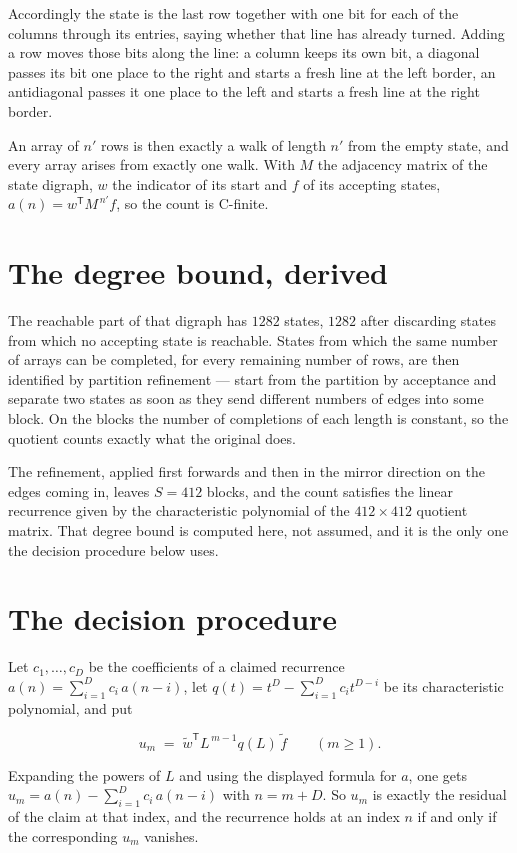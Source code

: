 \documentclass[11pt]{article}
\theoremstyle{definition}
\begin{document}
Accordingly the state is the last row together with one bit for each of the columns through its entries, saying whether that line has already turned. Adding a row moves those bits along the line: a column keeps its own bit, a diagonal passes its bit one place to the right and starts a fresh line at the left border, an antidiagonal passes it one place to the left and starts a fresh line at the right border.

An array of $n'$ rows is then exactly a walk of length $n'$ from the empty state, and every array arises from exactly one walk. With $M$ the adjacency matrix of the state digraph, $w$ the indicator of its start and $f$ of its accepting states, $a(n) = w^{\mathsf T}M^{\,n'}f$, so the count is C-finite.

\section{The degree bound, derived}

The reachable part of that digraph has $1282$ states, $1282$ after discarding states from which no accepting state is reachable. States from which the same number of arrays can be completed, for every remaining number of rows, are then identified by partition refinement --- start from the partition by acceptance and separate two states as soon as they send different numbers of edges into some block. On the blocks the number of completions of each length is constant, so the quotient counts exactly what the original does.

The refinement, applied first forwards and then in the mirror direction on the edges coming in, leaves $S = 412$ blocks, and the count satisfies the linear recurrence given by the characteristic polynomial of the $412 \times 412$ quotient matrix. That degree bound is computed here, not assumed, and it is the only one the decision procedure below uses.

\section{The decision procedure}

Let $c_1,\dots,c_D$ be the coefficients of a claimed recurrence $a(n) = \sum_{i=1}^{D} c_i\,a(n-i)$, let $q(t) = t^{D} - \sum_{i=1}^{D} c_i t^{D-i}$ be its characteristic polynomial, and put

\[u_m \;=\; \tilde w^{\mathsf T} L^{\,m-1} q(L)\,\tilde f \qquad (m \ge 1).\]

Expanding the powers of $L$ and using the displayed formula for $a$, one gets $u_m = a(n) - \sum_{i=1}^{D} c_i\,a(n-i)$ with $n = m + D$. So $u_m$ is exactly the residual of the claim at that index, and the recurrence holds at an index $n$ if and only if the corresponding $u_m$ vanishes.
\end{document}
